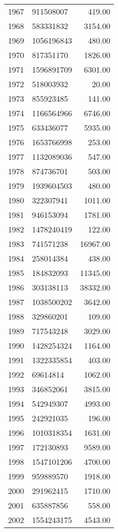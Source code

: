 \begin{table}[ht]
\begin{tabular}{rlr}
  1967 & 911508007 & 419.00 \\ 
  1968 & 583331832 & 3154.00 \\ 
  1969 & 1056196843 & 480.00 \\ 
  1970 & 817351170 & 1826.00 \\ 
  1971 & 1596891709 & 6301.00 \\ 
  1972 & 518003932 & 20.00 \\ 
  1973 & 855923485 & 141.00 \\ 
  1974 & 1166564966 & 6746.00 \\ 
  1975 & 633436077 & 5935.00 \\ 
  1976 & 1653766998 & 253.00 \\ 
  1977 & 1132089036 & 547.00 \\ 
  1978 & 874736701 & 503.00 \\ 
  1979 & 1939604503 & 480.00 \\ 
  1980 & 322307941 & 1011.00 \\ 
  1981 & 946153094 & 1781.00 \\ 
  1982 & 1478240419 & 122.00 \\ 
  1983 & 741571238 & 16967.00 \\ 
  1984 & 258014384 & 438.00 \\ 
  1985 & 184832093 & 11345.00 \\ 
  1986 & 303138113 & 38332.00 \\ 
  1987 & 1038500202 & 3642.00 \\ 
  1988 & 329860201 & 109.00 \\ 
  1989 & 717543248 & 3029.00 \\ 
  1990 & 1428254324 & 1164.00 \\ 
  1991 & 1322335854 & 403.00 \\ 
  1992 & 69614814 & 1062.00 \\ 
  1993 & 346852061 & 3815.00 \\ 
  1994 & 542949307 & 4993.00 \\ 
  1995 & 242921035 & 196.00 \\ 
  1996 & 1010318354 & 1631.00 \\ 
  1997 & 172130893 & 9589.00 \\ 
  1998 & 1547101206 & 4700.00 \\ 
  1999 & 959889570 & 1918.00 \\ 
  2000 & 291962415 & 1710.00 \\ 
  2001 & 635887856 & 558.00 \\ 
  2002 & 1554243175 & 4543.00 \\ 

\end{tabular}
\end{table}
